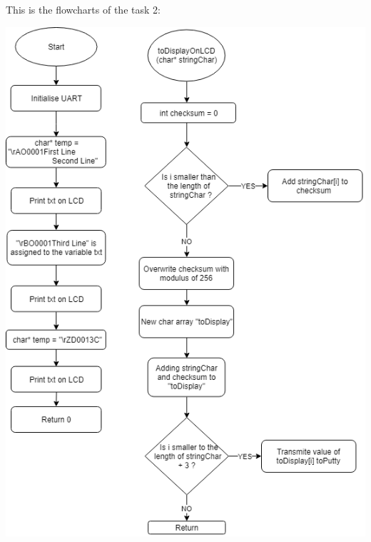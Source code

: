 \documentclass[a4paper,12pt]{article}
\begin{document}
\newpage
This is the flowcharts of the task 2:
\begin{center}
\includegraphics[scale=1.1]{img/Task2.png}
\end{center}

\newpage
\end{document}
